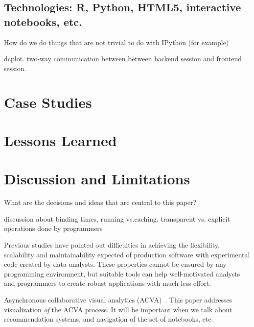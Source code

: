 \documentclass[review,journal]{vgtc}         %
\begin{document}
\subsection{Technologies: R, Python, HTML5, interactive notebooks, etc.}

How do we do things that are not trivial to do with IPython (for example)

dcplot. two-way communication between between backend session and
frontend session.

\section{Case Studies}

\section{Lessons Learned}

\section{Discussion and Limitations}

What are the decisions and ideas that are central to this paper?

discussion about binding times, running vs.caching.
transparent vs. explicit operations done by programmers

Previous studies have pointed out difficulties in achieving the flexibility,
scalability and maintainability expected of production software with experimental
code created by data analysts.
These properties cannot be ensured by any programming environment,
but suitable tools can help well-motivated analysts and programmers to create
robust applications with much less effort.

Asynchronous collaborative visual analytics
(ACVA)~\cite{Chen:2011:SEC}. This paper addresses visualization
\emph{of} the ACVA process. It will be important when we talk about
recommendation systems, and navigation of the set of notebooks, etc.




\end{document}
